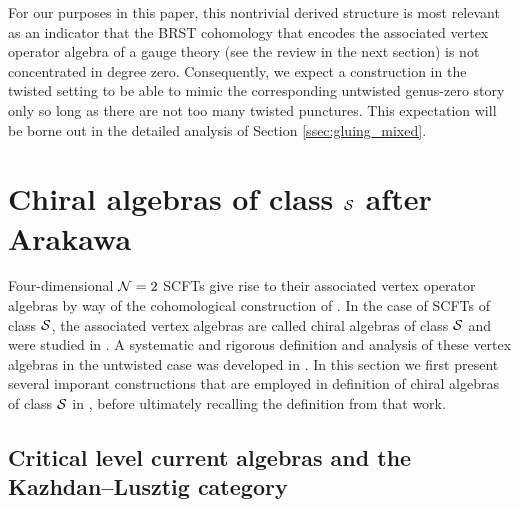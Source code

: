 \documentclass[a4paper]{article}
\def\NN{{\cal N}}
\def\SS{{\cal S}}
\begin{document}
For our purposes in this paper, this nontrivial derived structure is most relevant as an indicator that the BRST cohomology that encodes the associated vertex operator algebra of a gauge theory (see the review in the next section) is not concentrated in degree zero. Consequently, we expect a construction in the twisted setting to be able to mimic the corresponding untwisted genus-zero story only so long as there are not too many twisted punctures. This expectation will be borne out in the detailed analysis of Section \ref{ssec:gluing_mixed}.


\section{Chiral algebras of class \texorpdfstring{$\SS$}{S} after Arakawa}
\label{sec:chiral_background}

Four-dimensional $\NN=2$ SCFTs give rise to their associated vertex operator algebras by way of the cohomological construction of \cite{Beem:2013sza}. In the case of SCFTs of class $\SS$, the associated vertex algebras are called chiral algebras of class $\SS$ and were studied in \cite{Beem:2014rza}. A systematic and rigorous definition and analysis of these vertex algebras in the untwisted case was developed in \cite{Arakawa:2018egx}. In this section we first present several imporant constructions that are employed in definition of chiral algebras of class $\SS$ in \cite{Arakawa:2018egx}, before ultimately recalling the definition from that work.

\subsection{Critical level current algebras and the Kazhdan--Lusztig category}
\label{subsec:AKM_and_KL}
\end{document}
